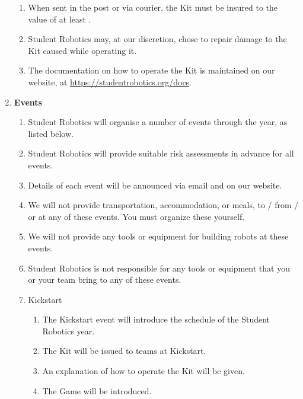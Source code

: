 \documentclass[a4paper, 11pt]{scrartcl}
\begin{document}
\begin{enumerate}
\begin{enumerate}
\item When sent in the post or via courier, the Kit must be insured to the value
of at least .

\item Student Robotics may, at our discretion, chose to repair damage to the
Kit caused while operating it.

\item The documentation on how to operate the Kit is maintained on our website,
at \url{https://studentrobotics.org/docs}.
\end{enumerate}

\item \textbf{Events}
\begin{enumerate}

\item Student Robotics will organise a number of events through the year, as
listed below.

\item Student Robotics will provide suitable risk assessments in advance for all events.

\item Details of each event will be announced via email and on our website.

\item We will not provide transportation, accommodation, or meals,
to / from / or at any of these events. You must organize these yourself.

\item We will not provide any tools or equipment for building robots at these
events.

\item Student Robotics is not responsible for any tools or equipment that you
or your team bring to any of these events.

\item Kickstart

\begin{enumerate}
\item The Kickstart event will introduce the schedule of the Student Robotics
year.

\item The Kit will be issued to teams at Kickstart.

\item An explanation of how to operate the Kit will be given.

\item The Game will be introduced.
\end{enumerate}


\end{enumerate}
\end{enumerate}
\end{document}
